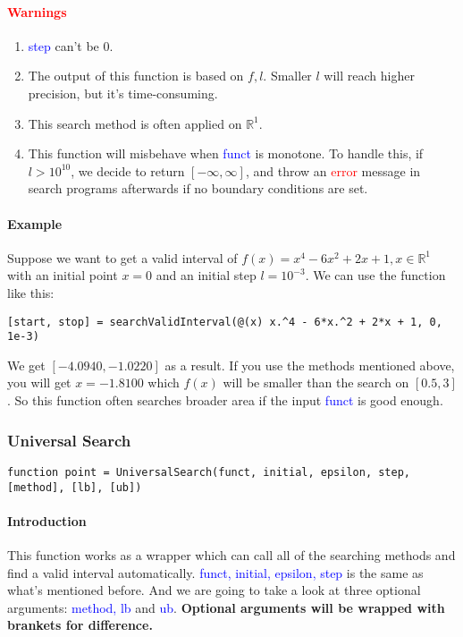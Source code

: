 \documentclass{article}
\begin{document}
\paragraph{\textcolor{red}{Warnings}}
\begin{enumerate}
    \item \textcolor{blue}{step} can't be $0$.
    \item The output of this function is based on $f, l$. Smaller $l$ will reach higher precision, but it's time-consuming.
    \item This search method is often applied on $\mathbb{R}^1$.
    \item This function will misbehave when \textcolor{blue}{funct} is monotone. To handle this, if $l > 10^{10}$, we decide to return $[-\infty, \infty]$, and throw an \textcolor{red}{error} message in search programs afterwards if no boundary conditions are set.
\end{enumerate}

\paragraph{Example}
Suppose we want to get a valid interval of $f(x) = x^4 - 6x^2 + 2x + 1, x \in \mathbb{R}^1$ with an initial point $x = 0$ and an initial step $l = 10^{-3}$. We can use the function like this:
\begin{verbatim}
[start, stop] = searchValidInterval(@(x) x.^4 - 6*x.^2 + 2*x + 1, 0, 1e-3)
\end{verbatim}

We get $[-4.0940, -1.0220]$ as a result. If you use the methods mentioned above, you will get $x = -1.8100$ which $f(x)$ will be smaller than the search on $[0.5, 3]$. So this function often searches broader area if the input \textcolor{blue}{funct} is good enough.

\subsubsection{Universal Search}
\begin{verbatim}
function point = UniversalSearch(funct, initial, epsilon, step, [method], [lb], [ub])
\end{verbatim}

\paragraph{Introduction}
This function works as a wrapper which can call all of the searching methods and find a valid interval automatically. \textcolor{blue}{funct, initial, epsilon, step} is the same as what's mentioned before. And we are going to take a look at three optional arguments: \textcolor{blue}{method, lb} and \textcolor{blue}{ub}. \textbf{Optional arguments will be wrapped with brankets for difference.}
\end{document}
